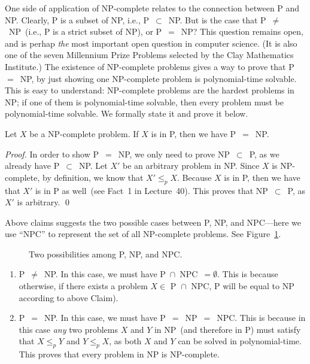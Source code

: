 One side of application of NP-complete relates to the connection between P and NP.
Clearly, P is a subset of NP, i.e., P{}~$\subset${}~NP.
But is the case that P{}~$\neq${}~NP~(i.e., P is a strict subset of NP),
or P{}~$=${}~NP?  This question remains open,
and is perhap \emph{the} most important open question in computer science.
(It is also one of the seven Millennium Prize Problems selected by the Clay Mathematics Institute.)
The existence of NP-complete problems gives a way to prove that P{}~$=${}~NP, by just showing
one NP-complete problem is polynomial-time solvable. This is easy to understand: NP-complete
problems are the hardest problems in NP; if one of them is polynomial-time solvable,
then every problem must be polynomial-time solvable. We formally state it and prove it below.

\begin{claim}
Let $X$ be a NP-complete problem. If $X$ is in P, then we have P{}~$=${}~NP.
\end{claim}

\emph{Proof.} 	
In order to show P{}~$=${}~NP, we only need to prove NP{}~$\subset${}~P, as we already have P{}~$\subset${}~NP. 
Let $X'$ be an arbitrary problem in NP.  
Since $X$ is NP-complete, by definition, we know that $X'\le_p X$. Because
$X$ is in P, then we have that $X'$ is in P as well~(see Fact~1 in Lecture~40).
This proves that NP{}~$\subset${}~P, as $X'$ is arbitrary.  \qed

Above claims suggests the two possible cases between P, NP, and NPC---here we use ``NPC''
to represent the set of all NP-complete problems. See Figure~\ref{fig:PvsNP}.

\begin{figure}[!h]
\centering{}
\caption{Two possibilities among P, NP, and NPC.}
\label{fig:PvsNP}
\end{figure}

\begin{enumerate}
\item P{}~$\neq${}~NP. In this case, we must have P{}~$\cap${}~NPC{}~$=\emptyset$. This is
because otherwise, if there exists a problem $X\in \textrm{ P } \cap \textrm{ NPC}$, P will be equal to NP according to above Claim). 
\item P{}~$=${}~NP. In this case, we must have P{}~$=${}~NP{}~$=${}~NPC. 
This is because in this case \emph{any} two problems $X$ and $Y$ in NP~(and therefore in P)
must satisfy that $X\le_p Y$ and $Y\le_p X$, as both $X$ and $Y$ can be solved in polynomial-time.
This proves that every problem in NP is NP-complete.
\end{enumerate}

